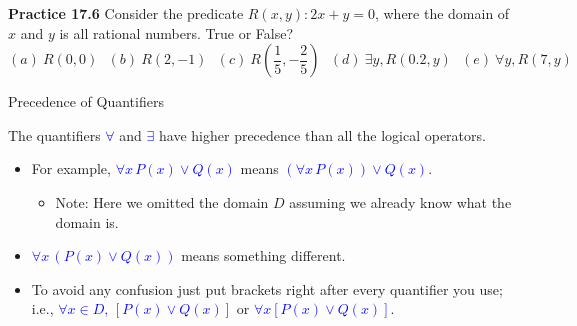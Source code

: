 \documentclass[aspectratio=169]{beamer}
\providecommand{\Blue}[1]{\textcolor{blue}{#1}}
\begin{document}
\begin{frame}[plain]{}

{\bf Practice 17.6} Consider the predicate $R(x,y): 2x+y=0$, 
    where the domain of $x$ and $y$ is all rational numbers. 
    True or False?
    \[ (a)\ R(0,0)\ \ \ (b)\ R(2, -1)\ \ \ (c)\ R(\frac{1}{5}, -\frac{2}{5})\ \ \ 
       (d)\ \exists y, R(0.2, y)\ \ \ (e)\ \forall y, R(7,y)
     \]

\vspace{1in}

 \end{frame}


\begin{frame}[plain]{Precedence of  Quantifiers}

The quantifiers \Blue{$\forall$} and \Blue{$\exists$} have higher precedence than
           all the logical operators.
  
  \begin{itemize}
    \item  For example, \Blue{$\forall x\, P(x)\vee Q(x)$} means \Blue{$(\forall x\, P(x))\vee Q(x)$}.
       \begin{itemize}
          \item Note: Here we omitted the domain $D$ assuming we already know what the domain is.
       \end{itemize}\pause 
    \item  \Blue{$\forall x\, (P(x)\vee Q(x))$} means something different. \pause 
    \item To avoid any confusion just put brackets right after
         every quantifier you use; i.e., \Blue{$\forall x\in D,\, \left[ P(x)\vee Q(x)\right]$} or
         \Blue{$\forall x \left[ P(x)\vee Q(x)\right]$}.
 \end{itemize}
\end{frame}
\end{document}
